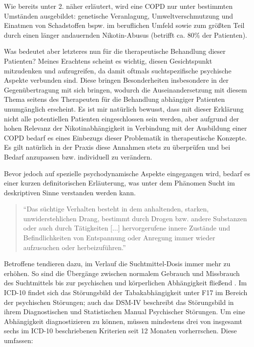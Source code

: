 Wie bereits unter 2. näher erläutert, wird eine COPD nur unter bestimmten Umständen ausgebildet: genetische Veranlagung, Umweltverschmutzung und Einatmen von Schadstoffen bspw. im beruflichen Umfeld sowie zum größten Teil durch einen länger andauernden Nikotin-Abusus (betrifft ca. 80\% der Patienten). 

Was bedeutet aber letzteres nun für die therapeutische Behandlung dieser Patienten? Meines Erachtens scheint es wichtig, diesen Gesichtspunkt mitzudenken und aufzugreifen, da damit oftmals  suchtspezifische psychische Aspekte verbunden sind. Diese bringen Besonderheiten insbesondere in der Gegenübertragung mit sich bringen, wodurch die Auseinandersetzung mit diesem Thema seitens des Therapeuten für die Behandlung abhängiger Patienten unumgänglich erscheint. Es ist mir natürlich bewusst, dass mit dieser Erklärung nicht alle potentiellen Patienten eingeschlossen sein werden, aber aufgrund der hohen Relevanz der Nikotinabhängigkeit in Verbindung mit der Ausbildung einer COPD bedarf es eines Einbezugs dieser Problematik in therapeutische Konzepte. Es gilt natürlich in der Praxis diese Annahmen stets zu überprüfen und bei Bedarf anzupassen bzw. individuell zu verändern.

Bevor jedoch auf spezielle psychodynamische Aspekte eingegangen wird, bedarf es einer kurzen definitorischen Erläuterung, was unter dem Phänomen Sucht im deskriptiven Sinne verstanden werden kann. 

\begin{quote}
\onehalfspacing
"`Das süchtige Verhalten besteht in dem anhaltenden, starken, unwiderstehlichen Drang, bestimmt durch Drogen bzw. andere Substanzen oder auch durch Tätigkeiten [...] hervorgerufene innere Zustände und Befindlichkeiten von Entspannung oder Anregung immer wieder aufzusuchen oder herbeizuführen."' \autocite[173]{mentzos2011} 
\end{quote}

Betroffene tendieren dazu, im Verlauf die Suchtmittel-Dosis immer mehr zu erhöhen. So sind die Übergänge zwischen normalem Gebrauch und Missbrauch des Suchtmittels bis zur psychischen und körperlichen Abhängigkeit fließend \autocite[vgl.][173]{mentzos2011}. Im ICD-10 findet sich das Störungsbild der Tabakabhängigkeit unter F17 im Bereich der psychischen Störungen; auch das DSM-IV beschreibt das Störungsbild in ihrem Diagnostischen und Statistischen Manual Psychischer Störungen. Um eine Abhängigkeit diagnostizieren zu können, müssen mindestens drei von insgesamt sechs im ICD-10 beschriebenen Kriterien seit 12 Monaten vorherrschen. Diese umfassen:

